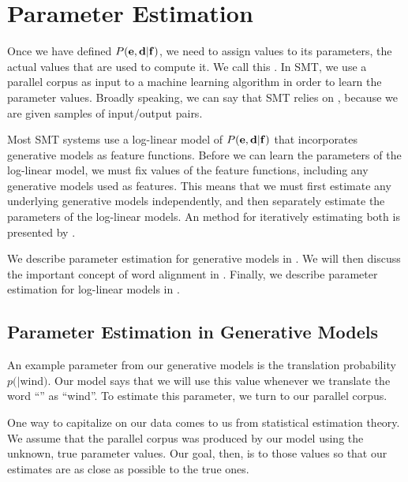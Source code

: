 
\section{Parameter Estimation}\label{sec:parameter-estimation}

Once we have defined $P({\bf e},{\bf d}|{\bf f})$, we need to 
assign values to its parameters, 
the actual values that are used to compute it.
We call this .
In SMT, we use a parallel corpus as input
to a machine learning algorithm in order
to learn the parameter values.  Broadly speaking, 
we can say that SMT relies on ,
because we are given samples of input/output pairs.

Most SMT systems use a log-linear model of $P({\bf e},{\bf d}|{\bf f})$ that
incorporates generative models as feature functions.
Before we can learn the parameters of 
the log-linear model, we must fix values of the feature
functions, including any generative models used as features.
This means that we must first estimate any underlying
generative models independently, and then separately estimate
the parameters of the log-linear models.  An method for
iteratively estimating both is presented by \citet{Fraser:2006:acl-coling}.

We describe parameter estimation for generative
models in .
We will then discuss the important concept of word
alignment in .
Finally, we describe parameter 
estimation for log-linear models in
.



\subsection{Parameter Estimation in Generative
Models}\label{sec:parameter-estimation-generative}

An example parameter from our generative models
is the translation probability $p($$|$wind$)$.
Our model says that we will use this value whenever
we translate the word ``'' as ``wind''.  To
estimate this parameter, we turn to our parallel
corpus.

One way to capitalize on our data comes to us
from statistical estimation theory.  We assume
that the parallel corpus was produced by our model 
using the unknown, true parameter values.
Our goal, then, is to  those values
so that our estimates are as close as possible 
to the true ones.

